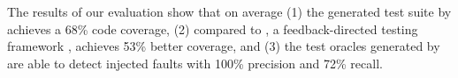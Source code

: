 The results of our evaluation show that on average (1) the generated test suite by \tool achieves a 68\% \javascript code coverage, 
(2) compared to \artemis, a feedback-directed \javascript testing framework \cite{artzi:icse11}, \tool achieves 53\% better coverage, and (3) the test oracles generated by \tool are able to detect injected faults with 100\% precision and 72\% recall.





